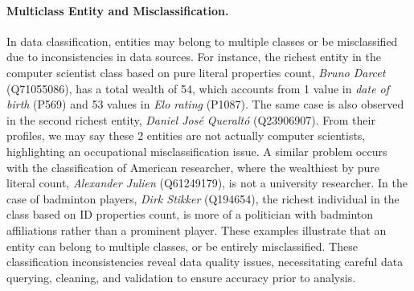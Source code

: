 

\paragraph{Multiclass Entity and Misclassification.}
In data classification, entities may belong to multiple classes or be misclassified due to inconsistencies in data sources. For instance, the richest entity in the computer scientist class based on pure literal properties count, \textit{Bruno Darcet} (Q71055086), has a total wealth of 54, which accounts from 1 value in \textit{date of birth} (P569) and 53 values in \textit{Elo rating} (P1087). The same case is also observed in the second richest entity, \textit{Daniel José Queraltó} (Q23906907). From their profiles, we may say these 2 entities are not actually computer scientists, highlighting an occupational misclassification issue. A similar problem occurs with the classification of American researcher, where the wealthiest by pure literal count, \textit{Alexander Julien} (Q61249179), is not a university researcher. In the case of badminton players, \textit{Dirk Stikker} (Q194654), the richest individual in the class based on ID properties count, is more of a politician with badminton affiliations rather than a prominent player. These examples illustrate that an entity can belong to multiple classes, or be entirely misclassified. These classification inconsistencies reveal data quality issues, necessitating careful data querying, cleaning, and validation to ensure accuracy prior to analysis.